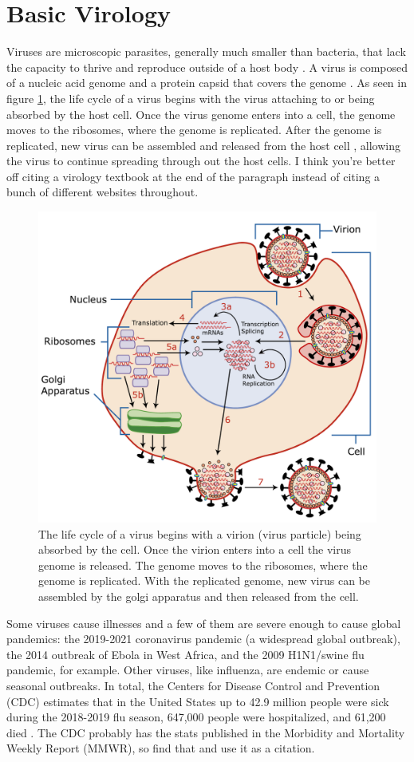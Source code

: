 \section{Basic Virology}
Viruses are microscopic parasites, generally much smaller than bacteria, that lack the capacity to thrive and reproduce outside of a host body \citep{website2}. A virus is composed of a nucleic acid genome and a protein capsid that covers the genome \citep{website3}. As seen in figure \ref{fig:Virus_Replication}, the life cycle of a virus begins with the virus attaching to or being absorbed by the host cell. Once the virus genome enters into a cell, the genome moves to the ribosomes, where the genome is replicated. After the genome is replicated, new virus can be assembled and released from the host cell \citep{Kaiser}, allowing the virus to continue spreading through out the host cells. \color{red} I think you're better off citing a virology textbook at the end of the paragraph instead of citing a bunch of different websites throughout.\color{black}

\begin{figure}[h]
    \centering
    \includegraphics[width=0.6\linewidth]{Figures/Virus_Replication_large.pdf}
    \caption{The life cycle of a virus begins with a virion (virus particle) being absorbed by the cell. Once the virion enters into a cell the virus genome is released. The genome moves to the ribosomes, where the genome is replicated. With the replicated genome, new virus can be assembled by the golgi apparatus and then released from the cell.}
    \label{fig:Virus_Replication}
\end{figure}

Some viruses cause illnesses and a few of them are severe enough to cause global pandemics: the 2019-2021 coronavirus pandemic (a widespread global outbreak), the 2014 outbreak of Ebola in West Africa, and the 2009 H1N1/swine flu pandemic, for example. Other viruses, like influenza, are endemic or cause seasonal outbreaks. In total, the Centers for Disease Control and Prevention (CDC) estimates that in the United States up to 42.9 million people were sick during the 2018-2019 flu season, 647,000 people were hospitalized, and 61,200 died \citep{website4}. \color{red} The CDC probably has the stats published in the Morbidity and Mortality Weekly Report (MMWR), so find that and use it as a citation. \color{black}

